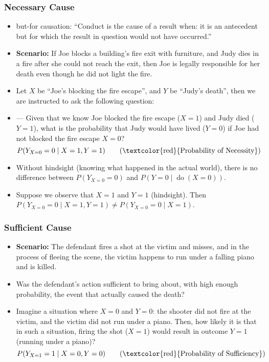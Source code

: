 \documentclass[UTF8,11pt,colorlinks,compress,openany]{beamer}%
\begin{document}
\begin{frame}\frametitle{Necessary Cause}
\begin{itemize}
	\item but-for causation: ``Conduct is the cause of a result when: it is an antecedent but for which the result in question would not have occurred.''
	\item \textbf{Scenario:} If Joe blocks a building's fire exit with furniture, and Judy dies in a fire after she could not reach the exit, then Joe is legally responsible for her death even though he did not light the fire.
	\item Let $X$ be ``Joe's blocking the fire escape'', and $Y$ be ``Judy's death'', then we are instructed to ask the following question:
	\item --- Given that we know Joe blocked the fire escape ($X=1$) and Judy died ($Y=1$), what is the probability that Judy would have lived ($Y=0$) if Joe had not blocked the fire escape $X=0$?
	\[P(Y_{X=0}=0\mid X=1,Y=1)\tag{\textcolor{red}{Probability of Necessity}}\]
	\item Without hindsight (knowing what happened in the actual world), there is no difference between $P(Y_{X=0}=0)$ and $P(Y=0\mid\operatorname{do}(X=0))$.
	\item Suppose we observe that $X=1$ and $Y=1$ (hindsight). Then $P(Y_{X=0}=0\mid X=1,Y=1)\ne P(Y_{X=0}=0\mid X=1)$.
\end{itemize}
\end{frame}

\begin{frame}\frametitle{Sufficient Cause}
\begin{itemize}
	\item \textbf{Scenario:} The defendant fires a shot at the victim and misses, and in the process of fleeing the scene, the victim happens to run under a falling piano and is killed.
	\item Was the defendant's action sufficient to bring about, with high enough probability, the event that actually caused the death?
	\item Imagine a situation where $X=0$ and $Y=0$: the shooter did not fire at the victim, and the victim did not run under a piano. Then, how likely it is that in such a situation, firing the shot ($X=1$) would result in outcome $Y=1$ (running under a piano)?
	\[P(Y_{X=1}=1\mid X=0,Y=0)\tag{\textcolor{red}{Probability of Sufficiency}}\]
\end{itemize}
\end{frame}
\end{document}
